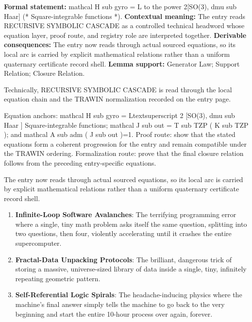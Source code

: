 \begingroup\footnotesize\setlength{\emergencystretch}{3em}\sloppy
\textbf{Formal statement:} mathcal H sub gyro = L to the power 2[SO(3), dmu sub Haar] (* Square-integrable functions *). \textbf{Contextual meaning:} The entry reads RECURSIVE SYMBOLIC CASCADE as a controlled technical headword whose equation layer, proof route, and registry role are interpreted together. \textbf{Derivable consequences:} The entry now reads through actual sourced equations, so its local arc is carried by explicit mathematical relations rather than a uniform quaternary certificate record shell. \textbf{Lemma support:} Generator Law; Support Relation; Closure Relation.\par
\endgroup

Technically, RECURSIVE SYMBOLIC CASCADE is read through the local equation chain and the TRAWIN normalization recorded on the entry page.

Equation anchors: mathcal H sub gyro = Ltextsuperscript 2 [SO(3), dmu sub Haar ] Square-integrable functions; mathcal J sub out = T sub TZP ( K sub TZP ); and mathcal A sub adm ( J sub out )=1. Proof route: show that the stated equations form a coherent progression for the entry and remain compatible under the TRAWIN ordering. Formalization route: prove that the final closure relation follows from the preceding entry-specific equations.

The entry now reads through actual sourced equations, so its local arc is carried by explicit mathematical relations rather than a uniform quaternary certificate record shell.
\endgroup

\begin{enumerate}[leftmargin=1.6em,itemsep=6pt,topsep=4pt]
\item \textbf{Infinite-Loop Software Avalanches}: The terrifying programming error where a single, tiny math problem asks itself the same question, splitting into two questions, then four, violently accelerating until it crashes the entire supercomputer.
\item \textbf{Fractal-Data Unpacking Protocols}: The brilliant, dangerous trick of storing a massive, universe-sized library of data inside a single, tiny, infinitely repeating geometric pattern.
\item \textbf{Self-Referential Logic Spirals}: The headache-inducing physics where the machine's final answer simply tells the machine to go back to the very beginning and start the entire 10-hour process over again, forever.
\end{enumerate}

